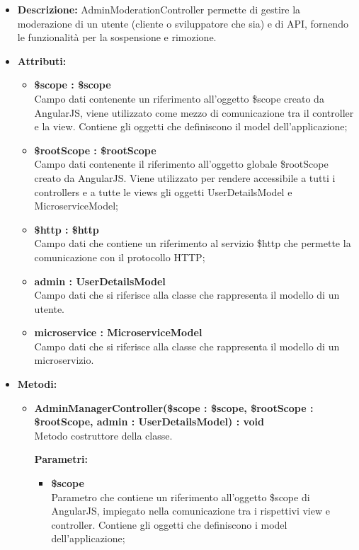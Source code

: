 \begin{itemize}
	\item \textbf{Descrizione:} AdminModerationController permette di gestire la moderazione di
un utente (cliente o sviluppatore che sia) e di API, fornendo le funzionalità per la
sospensione e rimozione.
	\item \textbf{Attributi:}
		\begin{itemize}
		
			\item \textbf{\$scope : \$scope}\\
			Campo dati contenente un riferimento all'oggetto \$scope creato da AngularJS, viene utilizzato come mezzo di comunicazione tra il controller e la view. Contiene gli oggetti che definiscono il model dell'applicazione;
			
			\item \textbf{\$rootScope : \$rootScope}\\
			Campo dati contenente il riferimento all'oggetto globale \$rootScope creato da AngularJS. Viene utilizzato per rendere accessibile a tutti i controllers e a tutte le views gli oggetti UserDetailsModel e MicroserviceModel;

			\item \textbf{\$http : \$http }\\
			Campo dati che contiene un riferimento al servizio \$http che permette la comunicazione con il protocollo HTTP;
				
			\item \textbf{admin : UserDetailsModel }\\
			Campo dati che si riferisce alla classe che rappresenta il modello di un utente.
			
			\item \textbf{microservice : MicroserviceModel }\\
			Campo dati che si riferisce alla classe che rappresenta il modello di un microservizio.
				
		\end{itemize}
	\item \textbf{Metodi:}
		\begin{itemize}
		
			\item \textbf{AdminManagerController(\$scope : \$scope, \$rootScope : \$rootScope, admin : UserDetailsModel) : void}\\
			Metodo costruttore della classe.
			\begin{description}
    			\item[\textbf{Parametri:}]
			\end{description}
			\begin{itemize}
				\item \textbf{\$scope}\\
				Parametro che contiene un riferimento all'oggetto \$scope di AngularJS, impiegato nella comunicazione tra i rispettivi view e controller. Contiene gli oggetti che definiscono i model dell'applicazione;
				

\end{itemize}
\end{itemize}
\end{itemize}

